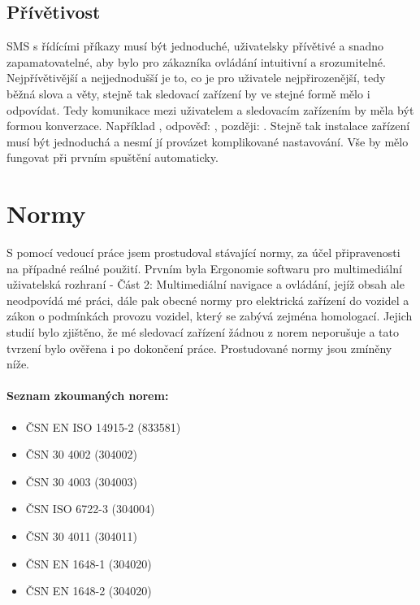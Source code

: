 \documentclass[FM,MP]{tulthesis}  %
\begin{document}
\subsection{Přívětivost}
SMS s řídícími příkazy musí být jednoduché, uživatelsky přívětivé a snadno zapamatovatelné, aby bylo pro zákazníka ovládání intuitivní a srozumitelné. Nejpřívětivější a nejjednodušší je to, co je pro uživatele nejpřirozenější, tedy běžná slova a věty, stejně tak sledovací zařízení by ve stejné formě mělo i odpovídat. Tedy komunikace mezi uživatelem a sledovacím zařízením by měla být formou konverzace. Například , odpověď: , později: . Stejně tak instalace zařízení musí být jednoduchá a nesmí jí provázet komplikované nastavování. Vše by mělo fungovat při prvním spuštění automaticky.

\section{Normy}
S pomocí vedoucí práce jsem prostudoval stávající normy, za účel připravenosti na případné reálné použití. Prvním byla Ergonomie softwaru pro multimediální uživatelská rozhraní - Část 2: Multimediální navigace a ovládání, jejíž obsah ale neodpovídá mé práci, dále pak obecné normy pro elektrická zařízení do vozidel a zákon o podmínkách provozu vozidel, který se zabývá zejména homologací. Jejich studií bylo zjištěno, že mé sledovací zařízení žádnou z norem neporušuje a tato tvrzení bylo ověřena i po dokončení práce. Prostudované normy jsou zmíněny níže.

\paragraph{Seznam zkoumaných norem:}
\begin{itemize}
\item ČSN EN ISO 14915-2 (833581)
\item ČSN 30 4002 (304002)
\item ČSN 30 4003 (304003)
\item ČSN ISO 6722-3 (304004)
\item ČSN 30 4011 (304011)
\item ČSN EN 1648-1 (304020)
\item ČSN EN 1648-2 (304020)
\end{itemize} 

\end{document}

